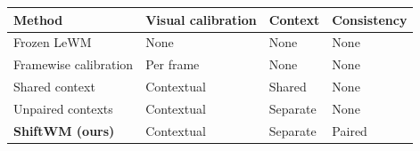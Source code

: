 \begingroup\small\setlength{\tabcolsep}{5pt}\renewcommand{\arraystretch}{1.12}
\begin{tabular}{@{}llll@{}}\toprule
Method & Visual calibration & Context & Consistency\\\midrule
Frozen LeWM & None & None & None\\
Framewise calibration & Per frame & None & None\\
Shared context & Contextual & Shared & None\\
Unpaired contexts & Contextual & Separate & None\\
\textbf{ShiftWM (ours)} & Contextual & Separate & Paired\\
\bottomrule\end{tabular}\endgroup
